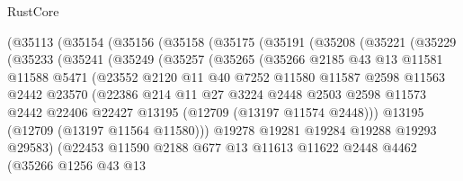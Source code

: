 \begin{lexlean}{RustCore}
\begin{coremodule}
    (@35113
      (@35154
        (@35156
          (@35158
            (@35175
              (@35191
                (@35208
                  (@35221
                    (@35229
                      (@35233
                        (@35241
                          (@35249
                            (@35257
                              (@35265
                                (@35266
                                  @2185
                                  @43
                                  @13
                                  @11581
                                  @11588
                                  @5471
                                  (@23552
                                    @2120
                                    @11
                                    @40
                                    @7252
                                    @11580
                                    @11587
                                    @2598
                                    @11563
                                    @2442
                                    @23570
                                    (@22386
                                      @214
                                      @11
                                      @27
                                      @3224
                                      @2448
                                      @2503
                                      @2598
                                      @11573
                                      @2442
                                      @22406
                                      @22427
                                      @13195
                                      (@12709 (@13197 @11574 @2448)))
                                    @13195
                                    (@12709 (@13197 @11564 @11580)))
                                  @19278
                                  @19281
                                  @19284
                                  @19288
                                  @19293
                                  @29583)
                                (@22453
                                  @11590
                                  @2188
                                  @677
                                  @13
                                  @11613
                                  @11622
                                  @2448
                                  @4462
                                  (@35266
                                    @1256
                                    @43
                                    @13

\end{coremodule}
\end{lexlean}

